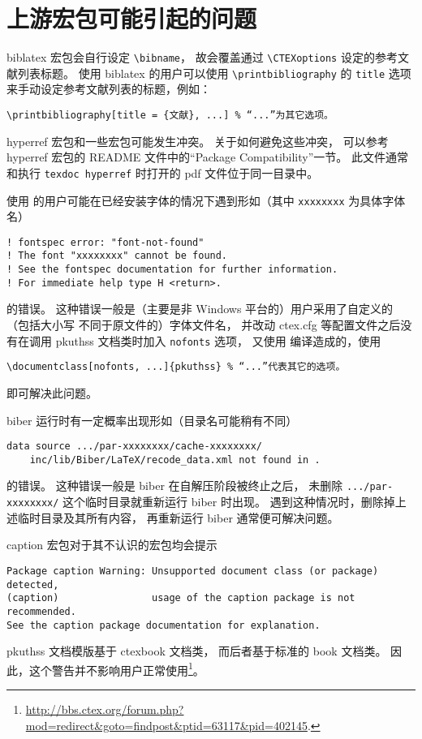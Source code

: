 	\section{上游宏包可能引起的问题}

	biblatex 宏包\supercite{biblatex}会自行设定 \verb|\bibname|，
	故会覆盖通过 \verb|\CTEXoptions| 设定的参考文献列表标题。
	使用 biblatex 的用户可以使用 \verb|\printbibliography| 的
	\verb|title| 选项来手动设定参考文献列表的标题，例如：
\begin{Verbatim}[frame = single]
\printbibliography[title = {文献}, ...] % “...”为其它选项。
\end{Verbatim}

	hyperref 宏包\supercite{hyperref}和一些宏包可能发生冲突。
	关于如何避免这些冲突，
	可以参考 hyperref 宏包的 README 文件中的“Package Compatibility”一节。
	此文件通常和执行 \verb|texdoc hyperref| %
	时打开的 pdf 文件位于同一目录中。

	使用  的用户可能在已经安装字体的情况下遇到形如（其中
	\verb|xxxxxxxx| 为具体字体名）
\begin{Verbatim}[frame = single, fontsize = {\small}]
! fontspec error: "font-not-found"
! The font "xxxxxxxx" cannot be found.
! See the fontspec documentation for further information.
! For immediate help type H <return>.
\end{Verbatim}
	的错误。
	这种错误一般是（主要是非 Windows 平台的）用户采用了自定义的（包括大小写
	不同于原文件的）字体文件名，
	并改动 ctex.cfg 等配置文件之后没有在调用 pkuthss 文档类时加入
	\verb|nofonts| 选项，
	又使用  编译造成的，使用
\begin{Verbatim}[frame = single]
\documentclass[nofonts, ...]{pkuthss} % “...”代表其它的选项。
\end{Verbatim}
	即可解决此问题。

	biber 运行时有一定概率出现形如（目录名可能稍有不同）
\begin{Verbatim}[frame = single, fontsize = {\small}]
data source .../par-xxxxxxxx/cache-xxxxxxxx/
	inc/lib/Biber/LaTeX/recode_data.xml not found in .
\end{Verbatim}
	的错误。
	这种错误一般是 biber 在自解压阶段被终止之后，
	未删除 \verb|.../par-xxxxxxxx/| 这个临时目录就重新运行 biber 时出现。
	遇到这种情况时，删除掉上述临时目录及其所有内容，
	再重新运行 biber 通常便可解决问题。

	caption 宏包\supercite{caption}对于其不认识的宏包均会提示
\begin{Verbatim}[frame = single, fontsize = {\small}]
Package caption Warning: Unsupported document class (or package) detected,
(caption)                usage of the caption package is not recommended.
See the caption package documentation for explanation.
\end{Verbatim}
	pkuthss 文档模版基于 ctexbook 文档类，
	而后者基于标准的 book 文档类。
	因此，这个警告并不影响用户正常使用\footnote{%
		\url{http://bbs.ctex.org/forum.php?mod=redirect&goto=findpost&ptid=63117&pid=402145}.%
	}。

